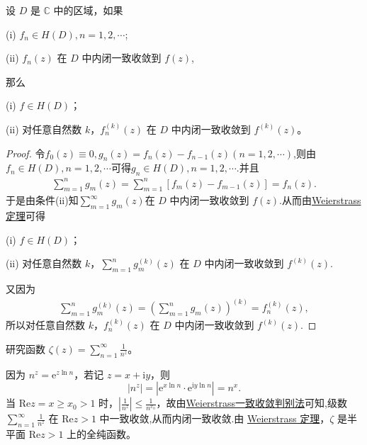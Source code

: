 \documentclass[../../main.tex]{subfiles}%
\begin{document}
\begin{corollary}\label{corollary:复变函数--函数项级数Weierstrass定理推论}
设 \( D \) 是 \( \mathbb{C} \) 中的区域，如果

(i) \( f_n \in H(D), n = 1, 2, \cdots \);

(ii) \( f_n(z) \) 在 \( D \) 中内闭一致收敛到 \( f(z) \),

那么

(i) \( f \in H(D) \)；

(ii) 对任意自然数 \( k \)，\( f_n^{(k)}(z) \) 在 \( D \) 中内闭一致收敛到 \( f^{(k)}(z) \)。
\end{corollary}
\begin{proof}
令$f_0(z)\equiv 0,g_n(z)=f_{n}(z)-f_{n-1}(z)(n=1,2,\cdots)$,则由$f_n\in H(D),n=1,2,\cdots$可得$g_n\in H(D),n=1,2,\cdots.$并且
\begin{align*}
\sum_{m=1}^n{g_m\left( z \right)}=\sum_{m=1}^n{\left[ f_m\left( z \right) -f_{m-1}\left( z \right) \right]}=f_n\left( z \right) .
\end{align*}
于是由条件(ii)知$\sum_{m=1}^{\infty}{g_m\left( z \right)}$在 \( D \) 中内闭一致收敛到 \( f(z) \).从而由\hyperref[theorem:Weierstrass定理]{Weierstrass定理}可得

(i) \( f \in H(D) \)；

(ii) 对任意自然数 \( k \)，\( \sum_{m=1}^{n} g_m^{(k)}(z) \) 在 \( D \) 中内闭一致收敛到 \( f^{(k)}(z) \).

又因为
\begin{align*}
\sum_{m=1}^n{g_{m}^{\left( k \right)}\left( z \right)}=\left( \sum_{m=1}^n{g_m\left( z \right)} \right) ^{\left( k \right)}=f_{n}^{\left( k \right)}\left( z \right) ,
\end{align*}
所以对任意自然数 \( k \)，\( f_{n}^{\left( k \right)}\left( z \right) \) 在 \( D \) 中内闭一致收敛到 \( f^{(k)}(z) \).
\end{proof}

\begin{example}
研究函数 \( \zeta(z) = \sum_{n=1}^{\infty} \frac{1}{n^z} \)。
\end{example}
\begin{solution}
因为 \( n^z = \mathrm{e}^{z \ln n} \)，若记 \( z = x + \mathrm{i}y \)，则
\[
|n^z| = |\mathrm{e}^{x \ln n} \cdot \mathrm{e}^{\mathrm{i}y \ln n}| = n^x.
\]
当 \( \mathrm{Re}z = x \geqslant x_0 > 1 \) 时，\( \left| \frac{1}{n^z} \right| \leqslant \frac{1}{n^{x_0}} \)，故由\hyperref[theorem:Weierstrass一致收敛判别法]{Weierstrass一致收敛判别法}可知,级数 \( \sum_{n=1}^{\infty} \frac{1}{n^z} \) 在 \( \mathrm{Re}z > 1 \) 中一致收敛,从而内闭一致收敛.由 \hyperref[theorem:Weierstrass定理]{Weierstrass 定理}，\( \zeta \) 是半平面 \( \mathrm{Re}z > 1 \) 上的全纯函数。

\end{solution}
\end{document}
